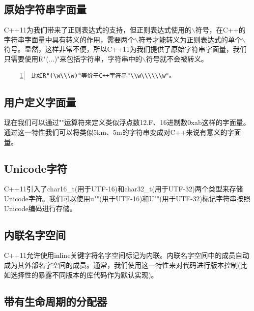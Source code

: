 \documentclass{ctexart}
\begin{document}
\subsection{原始字符串字面量}

C++11为我们带来了正则表达式的支持，但正则表达式使用的$\backslash$符号，在C++的字符串字面量中具有转义的作用，需要两个$\backslash$符号才能转义为正则表达式的单个$\backslash$符号。显然，这样非常不便，所以C++11为我们提供了原始字符串字面量，我们只需要使用R"(...)"来包括字符串，字符串中的$\backslash$符号就不会被转义。

\begin{lstlisting}[language={[ANSI]C},keywordstyle=\color{blue!70},commentstyle=\color{red!50!green!50!blue!50},frame=shadowbox, rulesepcolor=\color{red!20!green!20!blue!20},basicstyle=\small,numbers=left, numberstyle=\tiny,breaklines=true]
比如R"(\w\\\w)"等价于C++字符串"\\w\\\\\\w"。
\end{lstlisting}

\subsection{用户定义字面量}

现在我们可以通过""运算符来定义类似浮点数12.F、16进制数0xab这样的字面量。通过这一特性我们可以将类似5km、5m的字符串变成对C++来说有意义的字面量。

\subsection{Unicode字符}

C++11引入了char16\_t(用于UTF-16)和char32\_t(用于UTF-32)两个类型来存储Unicode字符。我们可以使用u""(用于UTF-16)和U""(用于UTF-32)标记字符串按照Unicode编码进行存储。

\subsection{内联名字空间}

C++11允许使用inline关键字将名字空间标记为内联。内联名字空间中的成员自动成为其外部名字空间的成员。通常，我们使用这一特性来对代码进行版本控制(比如选择性的暴露不同版本的库代码作为默认实现)。

\subsection{带有生命周期的分配器}
\end{document}
